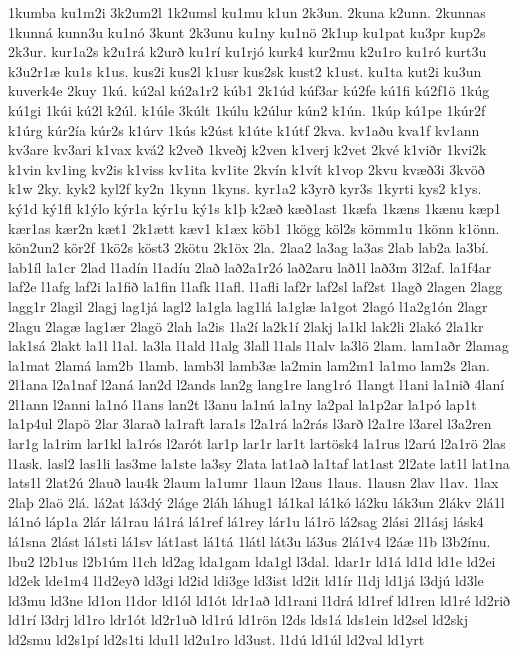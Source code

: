 {1kumba
ku1m2i
3k2um2l
1k2umsl
ku1mu
k1un
2k3un.
2kuna
k2unn.
2kunnas
1kunná
kunn3u
ku1nó
3kunt
2k3unu
ku1ny
ku1nö
2k1up
ku1pat
ku3pr
kup2s
2k3ur.
kur1a2s
k2u1rá
k2urð
ku1rí
ku1rjó
kurk4
kur2mu
k2u1ro
ku1ró
kurt3u
k3u2r1æ
ku1s
k1us.
kus2i
kus2l
k1usr
kus2sk
kust2
k1ust.
ku1ta
kut2i
ku3un
kuverk4e
2kuy
1kú.
kú2al
kú2a1r2
kúb1
2k1úd
kúf3ar
kú2fe
kú1fi
kú2f1ö
1kúg
kú1gi
1kúi
kú2l
k2úl.
k1úle
3kúlt
1kúlu
k2úlur
kún2
k1ún.
1kúp
kú1pe
1kúr2f
k1úrg
kúr2ía
kúr2s
k1úrv
1kús
k2úst
k1úte
k1útf
2kva.
kv1aðu
kva1f
kv1ann
kv3are
kv3ari
k1vax
kvá2
k2veð
1kveðj
k2ven
k1verj
k2vet
2kvé
k1viðr
1kvi2k
k1vin
kv1ing
kv2is
k1viss
kv1ita
kv1ite
2kvín
k1vít
k1vop
2kvu
kvæð3i
3kvöð
k1w
2ky.
kyk2
kyl2f
ky2n
1kynn
1kyns.
kyr1a2
k3yrð
kyr3s
1kyrti
kys2
k1ys.
ký1d
ký1fl
k1ýlo
kýr1a
kýr1u
ký1s
k1þ
k2æð
kæð1ast
1kæfa
1kæns
1kænu
kæp1
kær1as
kær2n
kæt1
2k1ætt
kæv1
k1æx
köb1
1kögg
köl2s
kömm1u
1könn
k1önn.
kön2un2
kör2f
1kö2s
köst3
2kötu
2k1öx
2la.
2laa2
la3ag
la3as
2lab
lab2a
la3bí.
lab1íl
la1cr
2lad
l1adín
l1adíu
2lað
lað2a1r2ó
lað2aru
lað1l
lað3m
3l2af.
la1f4ar
laf2e
l1afg
laf2i
la1fið
la1fin
l1afk
l1afl.
l1afli
laf2r
laf2sl
laf2st
1lagð
2lagen
2lagg
lagg1r
2lagil
2lagj
lag1já
lagl2
la1gla
lag1lá
la1glæ
la1got
2lagó
l1a2g1ón
2lagr
2lagu
2lagæ
lag1ær
2lagö
2lah
la2is
1la2í
la2k1í
2lakj
la1kl
lak2li
2lakó
2la1kr
lak1sá
2lakt
la1l
l1al.
la3la
l1ald
l1alg
3lall
l1als
l1alv
la3lö
2lam.
lam1aðr
2lamag
la1mat
2lamá
lam2b
1lamb.
lamb3l
lamb3æ
la2min
lam2m1
la1mo
lam2s
2lan.
2l1ana
l2a1naf
l2aná
lan2d
l2ands
lan2g
lang1re
lang1ró
1langt
l1ani
la1nið
4laní
2l1ann
l2anni
la1nó
l1ans
lan2t
l3anu
la1nú
la1ny
la2pal
la1p2ar
la1pó
lap1t
la1p4ul
2lapö
2lar
3larað
la1raft
lara1s
l2a1rá
la2rás
l3arð
l2a1re
l3arel
l3a2ren
lar1g
la1rim
lar1kl
la1rós
l2arót
lar1p
lar1r
lar1t
lartösk4
la1rus
l2arú
l2a1rö
2las
l1ask.
lasl2
las1li
las3me
la1ste
la3sy
2lata
lat1að
la1taf
lat1ast
2l2ate
lat1l
lat1na
lats1l
2lat2ú
2lauð
lau4k
2laum
la1umr
1laun
l2aus
1laus.
1lausn
2lav
l1av.
1lax
2laþ
2laö
2lá.
lá2at
lá3dý
2láge
2láh
láhug1
lá1kal
lá1kó
lá2ku
lák3un
2lákv
2lá1l
lá1nó
láp1a
2lár
lá1rau
lá1rá
lá1ref
lá1rey
lár1u
lá1rö
lá2sag
2lási
2l1ásj
lásk4
lá1sna
2lást
lá1sti
lá1sv
lát1ast
lá1tá
1látl
lát3u
lá3us
2lá1v4
l2áæ
l1b
l3b2ínu.
lbu2
l2b1us
l2b1úm
l1ch
ld2ag
lda1gam
lda1gl
l3dal.
ldar1r
ld1á
ld1d
ld1e
ld2ei
ld2ek
lde1m4
l1d2eyð
ld3gi
ld2id
ldi3ge
ld3ist
ld2it
ld1ír
l1dj
ld1já
l3djú
ld3le
ld3mu
ld3ne
ld1on
l1dor
ld1ól
ld1ót
ldr1að
ld1rani
l1drá
ld1ref
ld1ren
ld1ré
ld2rið
ld1rí
l3drj
ld1ro
ldr1ót
ld2r1uð
ld1rú
ld1rön
l2ds
lds1á
lds1ein
ld2sel
ld2skj
ld2smu
ld2s1pí
ld2s1ti
ldu1l
ld2u1ro
ld3ust.
l1dú
ld1úl
ld2val
ld1yrt
}
